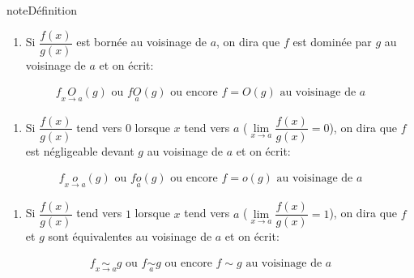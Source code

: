 \documentclass[letterpaper,10pt,french]{jupyterBook}
\begin{document}
\begin{sphinxadmonition}{note}{Définition}
\begin{enumerate}
%
\item {} 
\sphinxAtStartPar
Si \(\dfrac{f(x)}{g(x)}\) est bornée au voisinage de \(a\), on dira que \(f\) est dominée par \(g\) au voisinage de \(a\) et on écrit:

\end{enumerate}
\begin{equation*}
\begin{split}
f  \underset{x\to a}{O}(g) \mbox{ ou } f  \underset{a}{O}(g) \mbox{ ou encore } f = O(g) \mbox{ au voisinage de } a
\end{split}
\end{equation*}\begin{enumerate}
%
\item {} 
\sphinxAtStartPar
Si \(\dfrac{f(x)}{g(x)}\) tend vers \(0\) lorsque \(x\) tend vers \(a\) (\(\underset{x\to a}{\lim} \dfrac{f(x)}{g(x)}= 0\)), on dira que \(f\) est négligeable devant \(g\) au voisinage de \(a\) et on écrit:

\end{enumerate}
\begin{equation*}
\begin{split}
f  \underset{x\to a}{o}(g) \mbox{ ou } f  \underset{a}{o}(g) \mbox{ ou encore } f = o(g) \mbox{ au voisinage de } a
\end{split}
\end{equation*}\begin{enumerate}
%
\item {} 
\sphinxAtStartPar
Si \(\dfrac{f(x)}{g(x)}\) tend vers \(1\) lorsque \(x\) tend vers \(a\) (\(\underset{x\to a}{\lim} \dfrac{f(x)}{g(x)}= 1\)), on dira que \(f\) et \(g\) sont équivalentes au voisinage de \(a\) et on écrit:

\end{enumerate}
\begin{equation*}
\begin{split}
f  \underset{x\to a}{\sim}g \mbox{ ou } f  \underset{a}{\sim}g \mbox{ ou encore } f \sim g \mbox{ au voisinage de } a
\end{split}
\end{equation*}\end{sphinxadmonition}
\end{document}
